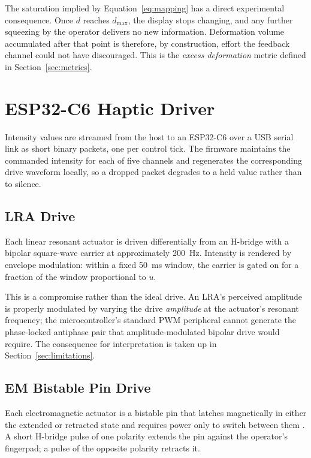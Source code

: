 \documentclass[12pt, a4paper, twoside, openright]{report}
\begin{document}
The saturation implied by Equation~\eqref{eq:mapping} has a direct experimental
consequence. Once $d$ reaches $d_{\max}$, the display stops changing, and any
further squeezing by the operator delivers no new information. Deformation
volume accumulated after that point is therefore, by construction, effort the
feedback channel could not have discouraged. This is the \emph{excess
    deformation} metric defined in Section~\ref{sec:metrics}.

\section{ESP32-C6 Haptic Driver}
\label{sec:driver}

Intensity values are streamed from the host to an ESP32-C6 over a USB serial
link as short binary packets, one per control tick. The firmware maintains the
commanded intensity for each of five channels and regenerates the corresponding
drive waveform locally, so a dropped packet degrades to a held value rather than
to silence.

\subsection{LRA Drive}
\label{subsec:lra-drive}

Each linear resonant actuator is driven differentially from an H-bridge with a
bipolar square-wave carrier at approximately \SI{200}{\hertz}. Intensity is
rendered by envelope modulation: within a fixed \SI{50}{\milli\second} window,
the carrier is gated on for a fraction of the window proportional to $u$.

This is a compromise rather than the ideal drive. An LRA's perceived amplitude
is properly modulated by varying the drive \emph{amplitude} at the actuator's
resonant frequency; the microcontroller's standard PWM peripheral cannot
generate the phase-locked antiphase pair that amplitude-modulated bipolar drive
would require. The consequence for interpretation is taken up in
Section~\ref{sec:limitations}.

\subsection{EM Bistable Pin Drive}
\label{subsec:em-drive}

Each electromagnetic actuator is a bistable pin that latches magnetically in
either the extended or retracted state and requires power only to switch between
them \cite{vechev2019}. A short H-bridge pulse of one polarity extends the pin against the
operator's fingerpad; a pulse of the opposite polarity retracts it.
\end{document}
